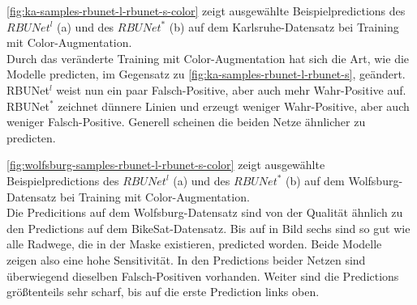 \autoref{fig:ka-samples-rbunet-l-rbunet-s-color} zeigt ausgewählte Beispielpredictions des $RBUNet^l$ (a) und 
des $RBUNet^*$ (b) auf dem Karlsruhe-Datensatz bei Training mit Color-Augmentation. \\
 Durch das veränderte Training mit Color-Augmentation hat sich die Art, wie die Modelle predicten, 
	im Gegensatz zu \autoref{fig:ka-samples-rbunet-l-rbunet-s}, geändert. RBUNet$^l$ weist nun ein paar 
	Falsch-Positive, aber auch mehr Wahr-Positive auf. RBUNet$^*$ zeichnet dünnere Linien und erzeugt 
	weniger Wahr-Positive, aber auch weniger Falsch-Positive. Generell scheinen die beiden Netze ähnlicher zu predicten. 

\autoref{fig:wolfsburg-samples-rbunet-l-rbunet-s-color} zeigt ausgewählte Beispielpredictions des $RBUNet^l$ (a) und 
des $RBUNet^*$ (b) auf dem Wolfsburg-Datensatz bei Training mit Color-Augmentation. \\
Die Predicitions auf dem Wolfsburg-Datensatz sind von der Qualität ähnlich zu den Predictions auf dem BikeSat-Datensatz.
Bis auf in Bild sechs sind so gut wie alle Radwege, die in der Maske existieren, predicted worden. 
Beide Modelle zeigen also eine hohe Sensitivität. In den Predictions beider Netzen 
sind überwiegend dieselben Falsch-Positiven vorhanden.
Weiter sind die Predictions größtenteils sehr scharf, bis auf die erste Prediction links oben. 

\pagebreak

